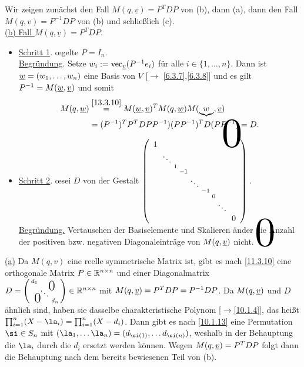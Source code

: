 \documentclass[../../main.tex]{subfiles}
\begin{document}
\begin{cproof}
Wir zeigen zunächst den Fall $M(q,\underline{v})=P^T{DP}$ von (b), dann (a), dann den Fall $M(q,\underline{v})=P^{-1}DP$ von (b) und schließlich (c).\\

\noindent\underline{(b) Fall $M(q,\underline{v})=P^T{DP}$}.
\begin{itemize}
\item[ ]\underline{Schritt 1}. \oe gelte $P=I_n$.\\
\underline{Begründung}. Setze $w_i:=\operatorname{vec}_{{\underline v}}(P^{-1}e_i)$ für alle $i\in\{1,\ldots ,n\}$. Dann ist ${\underline w}=(w_1,\ldots ,w_n)$ eine Basis von $V$ [$\to$ \ref{6.3.7},\ref{6.3.8}] und es gilt $P^{-1}=M({\underline w},{\underline v})$ und somit 
\begin{align*}
M(q,\underline{w})&\stackrel{\ref{13.3.10}}{=}M(\underline{w},\underline{v})^TM(q,\underline{w})M(\underbrace{w},\underline{v})\\
&=(P^{-1})^TP^TDPP^{-1})(PP^{-1})^TD(PP^{-1})=D.
\end{align*}
\item[ ]\underline{Schritt 2}. \oe sei $D$ von der Gestalt $\left(\begin{smallmatrix}
\tikz\node(c){$1$};\\
&\ddots\\
&&1\\
&&&-1\\
&&&&\ddots\\
&&&&&-1\\
&&&&&&0\\
&&&&&&&\ddots\\
&&&&&&&&\tikz\node(d){$0$};
\end{smallmatrix}\right)
\begin{tikzpicture}[overlay]
\node[below right of = c,xshift=0em,yshift=-4em,scale=5]{$0$};
\node[above left of = d,xshift=0em,yshift=4em,scale=5]{$0$};
\end{tikzpicture}$.\\
\underline{Begründung.} Vertauschen der Basiselemente und Skalieren änder die Anzahl der positiven bzw. negativen Diagonaleinträge von $M(q,{\underline v})$ nicht.
\end{itemize}
	
\noindent\underline{(a)} Da $M(q,v)$ eine reelle symmetrische Matrix ist, gibt es nach \ref{11.3.10} eine orthogonale Matrix $P\in \mathbb R^{n\times n}$ und einer Diagonalmatrix $D=\left(\begin{smallmatrix}
d_1 & & \llap{$\overset{\blap{\LARGE 0}}{~}$} \\
& \ddots &\\
\rlap{\tlap{\LARGE 0}} & & d_n\end{smallmatrix}\right)\in \R^{n\times n}$ mit $M(q,{\underline v})=P^TDP=P^{-1}DP$. Da $M(q,{\underline v})$ und $D$ ähnlich sind, haben sie dasselbe charakteristische Polynom [$\to$\ref{10.1.4}], das heißt $\prod_{i=1}^n(X-\la_i)=\prod_{i=1}^n(X-d_i)$. Dann gibt es nach \ref{10.1.13} eine Permutation $\si\in S_n$ mit $(\la_1,\ldots \la_n)=(d_{\si(1)},\ldots d_{\si(n)})$, weshalb in der Behauptung die $\la_i$ durch die $d_i$ ersetzt werden können. Wegen $M(q,{\underline v})=P^TDP$ folgt dann die Behauptung nach dem bereits bewiesenen Teil von (b).\\
		

\end{cproof}
\end{document}
